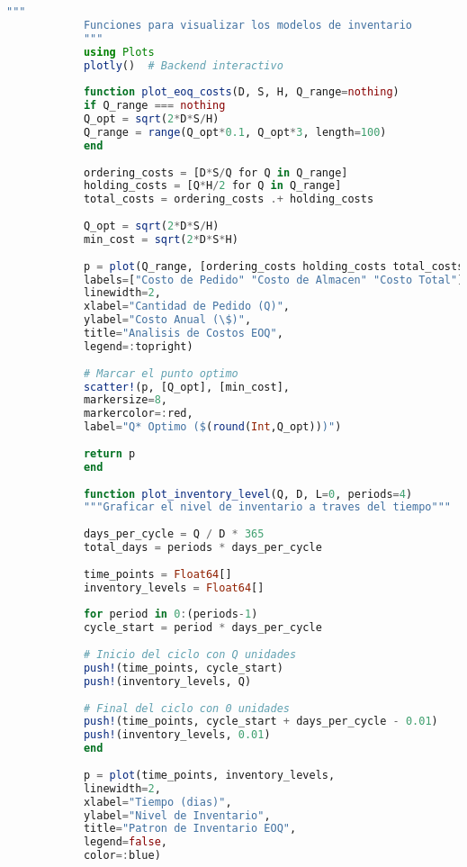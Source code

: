 \documentclass[12pt,a4paper]{book}
\begin{document}
	\begin{tcolorbox}[enhanced,colback=naranjaclaro,colframe=naranjaacento,boxrule=2pt,arc=8pt,
		title={\bfseries\color{white} \faChartArea\ GR\'AFICOS Y VISUALIZACI\'ON},breakable]
		
		\begin{lstlisting}[language=Julia,basicstyle=\footnotesize\ttfamily]
			"""
			Funciones para visualizar los modelos de inventario
			"""
			using Plots
			plotly()  # Backend interactivo
			
			function plot_eoq_costs(D, S, H, Q_range=nothing)
			if Q_range === nothing
			Q_opt = sqrt(2*D*S/H)
			Q_range = range(Q_opt*0.1, Q_opt*3, length=100)
			end
			
			ordering_costs = [D*S/Q for Q in Q_range]
			holding_costs = [Q*H/2 for Q in Q_range]
			total_costs = ordering_costs .+ holding_costs
			
			Q_opt = sqrt(2*D*S/H)
			min_cost = sqrt(2*D*S*H)
			
			p = plot(Q_range, [ordering_costs holding_costs total_costs],
			labels=["Costo de Pedido" "Costo de Almacen" "Costo Total"],
			linewidth=2,
			xlabel="Cantidad de Pedido (Q)",
			ylabel="Costo Anual (\$)",
			title="Analisis de Costos EOQ",
			legend=:topright)
			
			# Marcar el punto optimo
			scatter!(p, [Q_opt], [min_cost], 
			markersize=8, 
			markercolor=:red,
			label="Q* Optimo ($(round(Int,Q_opt)))")
			
			return p
			end
			
			function plot_inventory_level(Q, D, L=0, periods=4)
			"""Graficar el nivel de inventario a traves del tiempo"""
			
			days_per_cycle = Q / D * 365
			total_days = periods * days_per_cycle
			
			time_points = Float64[]
			inventory_levels = Float64[]
			
			for period in 0:(periods-1)
			cycle_start = period * days_per_cycle
			
			# Inicio del ciclo con Q unidades
			push!(time_points, cycle_start)
			push!(inventory_levels, Q)
			
			# Final del ciclo con 0 unidades
			push!(time_points, cycle_start + days_per_cycle - 0.01)
			push!(inventory_levels, 0.01)
			end
			
			p = plot(time_points, inventory_levels,
			linewidth=2,
			xlabel="Tiempo (dias)",
			ylabel="Nivel de Inventario",
			title="Patron de Inventario EOQ",
			legend=false,
			color=:blue)
			

\end{lstlisting}
\end{tcolorbox}
\end{document}
